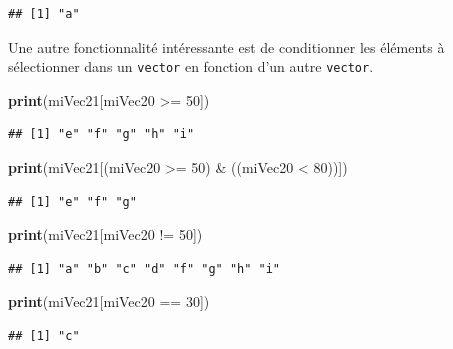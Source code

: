 \documentclass[twoside,symmetric]{book}
\newenvironment{Shaded}{}{}
\newcommand{\DecValTok}[1]{#1}
\newcommand{\KeywordTok}[1]{\textbf{#1}}
\newcommand{\NormalTok}[1]{#1}
\newcommand{\OperatorTok}[1]{#1}
\newcommand{\StringTok}[1]{#1}
\begin{document}
\begin{verbatim}
## [1] "a"
\end{verbatim}

Une autre fonctionnalité intéressante est de conditionner les éléments à sélectionner dans un \texttt{vector} en fonction d'un autre \texttt{vector}.

\begin{Shaded}
\begin{Highlighting}[]
\KeywordTok{print}\NormalTok{(miVec21[miVec20 }\OperatorTok{>=}\StringTok{ }\DecValTok{50}\NormalTok{])}
\end{Highlighting}
\end{Shaded}

\begin{verbatim}
## [1] "e" "f" "g" "h" "i"
\end{verbatim}

\begin{Shaded}
\begin{Highlighting}[]
\KeywordTok{print}\NormalTok{(miVec21[(miVec20 }\OperatorTok{>=}\StringTok{ }\DecValTok{50}\NormalTok{) }\OperatorTok{&}\StringTok{ }\NormalTok{((miVec20 }\OperatorTok{<}\StringTok{ }\DecValTok{80}\NormalTok{))])}
\end{Highlighting}
\end{Shaded}

\begin{verbatim}
## [1] "e" "f" "g"
\end{verbatim}

\begin{Shaded}
\begin{Highlighting}[]
\KeywordTok{print}\NormalTok{(miVec21[miVec20 }\OperatorTok{!=}\StringTok{ }\DecValTok{50}\NormalTok{])}
\end{Highlighting}
\end{Shaded}

\begin{verbatim}
## [1] "a" "b" "c" "d" "f" "g" "h" "i"
\end{verbatim}

\begin{Shaded}
\begin{Highlighting}[]
\KeywordTok{print}\NormalTok{(miVec21[miVec20 }\OperatorTok{==}\StringTok{ }\DecValTok{30}\NormalTok{])}
\end{Highlighting}
\end{Shaded}

\begin{verbatim}
## [1] "c"
\end{verbatim}
\end{document}
